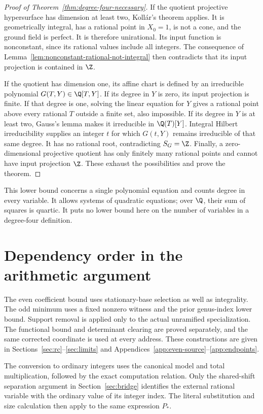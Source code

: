 \begin{proof}[Proof of Theorem~\ref{thm:degree-four-necessary}]
If the quotient projective hypersurface has dimension at least two,
Koll\'ar's theorem applies.  It is geometrically integral, has a
rational point in $X_0=1$, is not a cone, and the ground field is
perfect.  It is therefore unirational.  Its input function is
nonconstant, since its rational values include all integers.
The consequence of Lemma~\ref{lem:nonconstant-rational-not-integral}
then contradicts that its input projection is contained in $\Z$.

If the quotient has dimension one, its affine chart is defined by
an irreducible polynomial $G(T,Y)\in\Q[T,Y]$.  If its degree in $Y$
is zero, its input projection is finite.  If that degree is one,
solving the linear equation for $Y$ gives a rational point above
every rational $T$ outside a finite set, also impossible.
If its degree in $Y$ is at least two, Gauss's lemma makes it
irreducible in $\Q(T)[Y]$.  Integral Hilbert irreducibility supplies
an integer $t$ for which $G(t,Y)$ remains irreducible of that same
degree.  It has no rational root, contradicting $S_G=\Z$.
Finally, a zero-dimensional projective quotient has only finitely
many rational points and cannot have input projection $\Z$.
These exhaust the possibilities and prove the theorem.
\end{proof}

\begin{remark}
This lower bound concerns a single polynomial equation and counts
degree in every variable.  It allows systems of quadratic equations;
over $\Q$, their sum of squares is quartic.  It puts no lower bound
here on the number of variables in a degree-four definition.
\end{remark}


\appendix
\section{Dependency order in the arithmetic argument}\label{app:obligations}
The even coefficient bound uses stationary-base selection as well as
integrality. The odd minimum uses a fixed nonzero witness and the prior
genus-index lower bound. Support removal is applied only to the actual
unramified specialization. The functional bound and determinant clearing
are proved separately, and the same corrected coordinate is used at every
address. These constructions are given in Sections~\ref{sec:rc}--\ref{sec:limits}
and Appendices~\ref{app:even-source}--\ref{app:endpoints}.

The conversion to ordinary integers uses the canonical model and total
multiplication, followed by the exact computation relation. Only the
shared-shift separation argument in Section~\ref{sec:bridge} identifies
the external rational variable with the ordinary value of its integer
index. The literal substitution and size calculation then apply to the
same expression $P_*$.

